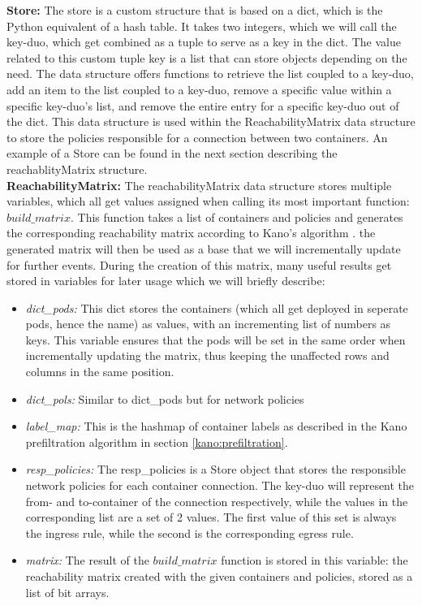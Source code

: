 \textbf{Store:} The store is a custom structure that is based on a dict, which is the Python equivalent of a hash table. It takes two integers, which we will call the key-duo, which get combined as a tuple to serve as a key in the dict. The value related to this custom tuple key is a list that can store objects depending on the need. The data structure offers functions to retrieve the list coupled to a key-duo, add an item to the list coupled to a key-duo, remove a specific value within a specific key-duo's list, and remove the entire entry for a specific key-duo out of the dict. This data structure is used within the ReachabilityMatrix data structure to store the policies responsible for a connection between two containers. An example of a Store can be found in the next section describing the reachablityMatrix structure.
\\[10pt]

\textbf{ReachabilityMatrix:} The reachabilityMatrix data structure stores multiple variables, which all get values assigned when calling its most important function: $build\_matrix$. This function takes a list of containers and policies and generates the corresponding reachability matrix according to Kano's algorithm \cite{kano}. the generated matrix will then be used as a base that we will incrementally update for further events. During the creation of this matrix, many useful results get stored in variables for later usage which we will briefly describe:

\begin{itemize}
    \renewcommand{\labelitemi}{\scriptsize$\blacksquare$}
    \item \textit{dict\_pods:} This dict stores the containers (which all get deployed in seperate pods, hence the name) as values, with an incrementing list of numbers as keys. This variable ensures that the pods will be set in the same order when incrementally updating the matrix, thus keeping the unaffected rows and columns in the same position.
     \item \textit{dict\_pols:} Similar to dict\_pods but for network policies
     \item \textit{label\_map:} This is the hashmap of container labels as described in the Kano prefiltration algorithm in section \ref{kano:prefiltration}. 
     \item \textit{resp\_policies:} The resp\_policies is a Store object that stores the responsible network policies for each container connection. The key-duo will represent the from- and to-container of the connection respectively, while the values in the corresponding list are a set of 2 values. The first value of this set is always the ingress rule, while the second is the corresponding egress rule.
     \item \textit{matrix:} The result of the $build\_matrix$ function is stored in this variable: the reachability matrix created with the given containers and policies, stored as a list of bit arrays.
\end{itemize}

